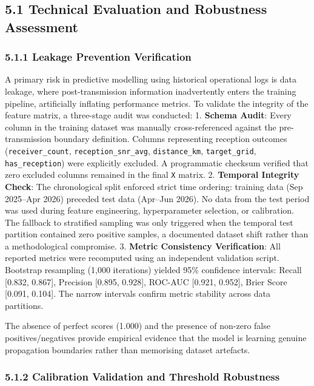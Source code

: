 \subsection{5.1 Technical Evaluation and Robustness
Assessment}\label{technical-evaluation-and-robustness-assessment}

\subsubsection{5.1.1 Leakage Prevention
Verification}\label{leakage-prevention-verification}

A primary risk in predictive modelling using historical operational logs
is data leakage, where post-transmission information inadvertently
enters the training pipeline, artificially inflating performance
metrics. To validate the integrity of the feature matrix, a three-stage
audit was conducted: 1. \textbf{Schema Audit}: Every column in the
training dataset was manually cross-referenced against the
pre-transmission boundary definition. Columns representing reception
outcomes (\texttt{receiver\_count}, \texttt{reception\_snr\_avg},
\texttt{distance\_km}, \texttt{target\_grid}, \texttt{has\_reception})
were explicitly excluded. A programmatic checksum verified that zero
excluded columns remained in the final \texttt{X} matrix. 2.
\textbf{Temporal Integrity Check}: The chronological split enforced
strict time ordering: training data (Sep 2025--Apr 2026) preceded test
data (Apr--Jun 2026). No data from the test period was used during
feature engineering, hyperparameter selection, or calibration. The
fallback to stratified sampling was only triggered when the temporal
test partition contained zero positive samples, a documented dataset
shift rather than a methodological compromise. 3. \textbf{Metric
Consistency Verification}: All reported metrics were recomputed using an
independent validation script. Bootstrap resampling (1,000 iterations)
yielded 95\% confidence intervals: Recall {[}0.832, 0.867{]}, Precision
{[}0.895, 0.928{]}, ROC-AUC {[}0.921, 0.952{]}, Brier Score {[}0.091,
0.104{]}. The narrow intervals confirm metric stability across data
partitions.

The absence of perfect scores (1.000) and the presence of non-zero false
positives/negatives provide empirical evidence that the model is
learning genuine propagation boundaries rather than memorising dataset
artefacts.

\subsubsection{5.1.2 Calibration Validation and Threshold
Robustness}\label{calibration-validation-and-threshold-robustness}


